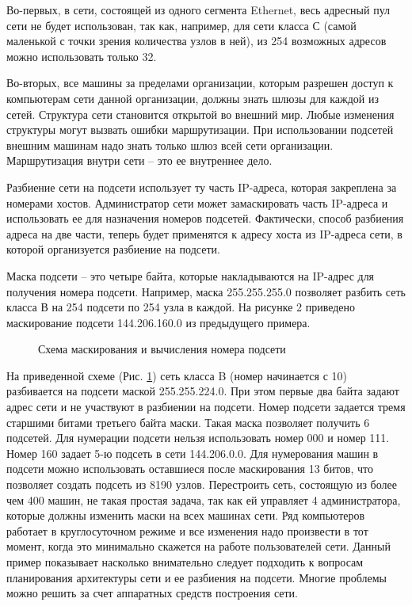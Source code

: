 \documentclass[a4paper]{article}
\begin{document}
	Во-первых, в сети, состоящей из одного сегмента Ethernet, весь адресный пул сети не будет использован, так как, например, для сети класса С (самой маленькой с точки зрения количества узлов в ней), из 254 возможных адресов можно использовать только 32.

	Во-вторых, все машины за пределами организации, которым разрешен доступ к компьютерам сети данной организации, должны знать шлюзы для каждой из сетей. Структура сети становится открытой во внешний мир. Любые изменения структуры могут вызвать ошибки маршрутизации. При использовании подсетей внешним машинам надо знать только шлюз всей сети организации. Маршрутизация внутри сети -- это ее внутреннее дело.

	Разбиение сети на подсети использует ту часть IP-адреса, которая закреплена за номерами хостов. 
Администратор сети может замаскировать часть IP-адреса и использовать ее для назначения номеров 
подсетей. Фактически, способ разбиения адреса на две части, теперь будет применятся к адресу хоста 
из IP-адреса сети, в которой организуется разбиение на подсети.

	Маска подсети -- это четыре байта, которые накладываются на IP-адрес для получения номера 
подсети. Например, маска 255.255.255.0 позволяет разбить сеть класса В на 254 подсети по 254 узла 
в каждой. На рисунке 2 приведено маскирование подсети 144.206.160.0 из предыдущего примера.

	\begin{figure}[h]
		\caption{Схема маскирования и вычисления номера подсети}
		\label{fig:markSceme}
	\end{figure}
	
	На приведенной схеме (Рис. \ref{fig:markSceme}) сеть класса B (номер начинается с 10) разбивается на подсети маской 255.255.224.0. При этом первые два байта задают адрес сети и не участвуют в разбиении на подсети. Номер подсети задается тремя старшими битами третьего байта маски. Такая маска позволяет получить 6 подсетей. Для нумерации подсети нельзя использовать номер 000 и номер 111. Номер 160 задает 5-ю подсеть в сети 144.206.0.0. Для нумерования машин в подсети можно использовать оставшиеся после маскирования 13 битов, что позволяет создать подсеть из 8190 узлов. Перестроить сеть, состоящую из более чем 400 машин, не такая простая задача, так как ей управляет 4 администратора, которые должны изменить маски на всех машинах сети. Ряд компьютеров работает в круглосуточном режиме и все изменения надо произвести в тот момент, когда это минимально скажется на работе пользователей сети. Данный пример показывает насколько внимательно следует подходить к вопросам планирования архитектуры сети и ее разбиения на подсети. Многие проблемы можно решить за счет аппаратных средств построения сети.
\end{document}
